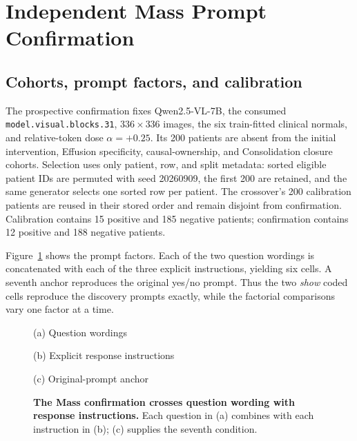 \section{Independent Mass Prompt Confirmation}
\label{app:mass-confirmation}

\subsection{Cohorts, prompt factors, and calibration}

The prospective confirmation fixes Qwen2.5-VL-7B, the consumed
\texttt{model.visual.blocks.31}, $336\times336$ images, the six train-fitted
clinical normals, and relative-token dose $\alpha=+0.25$.
Its 200 patients are absent from the initial intervention, Effusion
specificity, causal-ownership, and Consolidation closure cohorts.
Selection uses only patient, row, and split metadata: sorted eligible
patient IDs are permuted with seed 20260909, the first 200 are retained,
and the same generator selects one sorted row per patient.
The crossover's 200 calibration patients are reused in their stored order
and remain disjoint from confirmation. Calibration contains 15 positive
and 185 negative patients; confirmation contains 12 positive and 188 negative
patients.

Figure~\ref{fig:mass-prompts} shows the prompt factors. Each of the two
question wordings is concatenated with each of the three explicit
instructions, yielding six cells. A seventh anchor reproduces the original
yes/no prompt. Thus the two \textit{show} coded cells reproduce the
discovery prompts exactly, while the factorial comparisons vary one factor
at a time.

\begin{figure}[H]
\centering
\begin{minipage}{0.95\linewidth}
\small
{}
\par\smallskip\centerline{(a) Question wordings}\medskip
{}
\par\smallskip\centerline{(b) Explicit response instructions}\medskip
{}
\par\smallskip\centerline{(c) Original-prompt anchor}
\end{minipage}
\caption{\textbf{The Mass confirmation crosses question wording with response instructions.} Each question in (a) combines with each instruction in (b); (c) supplies the seventh condition.}
\label{fig:mass-prompts}
\end{figure}

